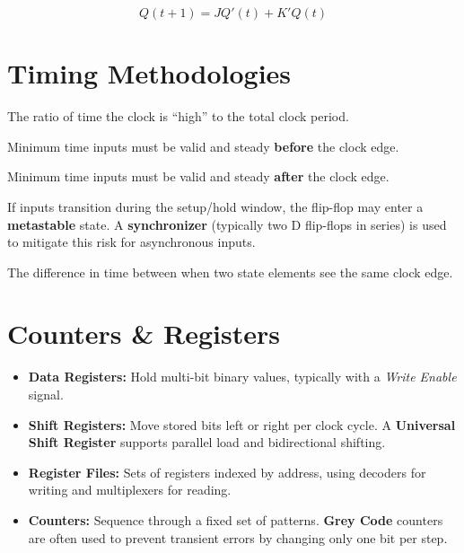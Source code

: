 \begin{proposition}
\begin{equation}
    Q(t+1) = J Q'(t) + K' Q(t)
\end{equation}
\end{proposition}

\section{Timing Methodologies}

\begin{vocabulary}
The ratio of time the clock is ``high'' to the total clock period.
\end{vocabulary}

\begin{vocabulary}
Minimum time inputs must be valid and steady \textbf{before} the clock edge.
\end{vocabulary}

\begin{vocabulary}
Minimum time inputs must be valid and steady \textbf{after} the clock edge.
\end{vocabulary}

\begin{remark}
If inputs transition during the setup/hold window, the flip-flop may enter a \textbf{metastable} state. A \textbf{synchronizer} (typically two D flip-flops in series) is used to mitigate this risk for asynchronous inputs.
\end{remark}

\begin{vocabulary}
The difference in time between when two state elements see the same clock edge.
\end{vocabulary}

\section{Counters \& Registers}

\begin{itemize}
    \item \textbf{Data Registers:} Hold multi-bit binary values, typically with a \textit{Write Enable} signal.
    \item \textbf{Shift Registers:} Move stored bits left or right per clock cycle. A \textbf{Universal Shift Register} supports parallel load and bidirectional shifting.
    \item \textbf{Register Files:} Sets of registers indexed by address, using decoders for writing and multiplexers for reading.
    \item \textbf{Counters:} Sequence through a fixed set of patterns. \textbf{Grey Code} counters are often used to prevent transient errors by changing only one bit per step.
\end{itemize}

